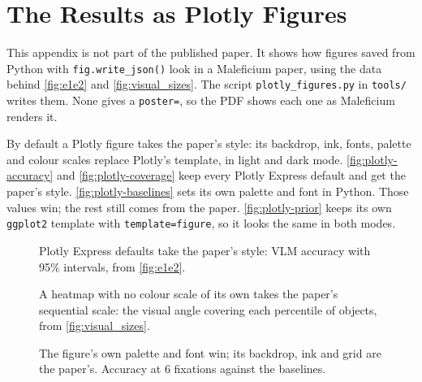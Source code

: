 \section{The Results as Plotly Figures}
\label{sec:plotly}

This appendix is not part of the published paper. It shows how figures saved from Python with \texttt{fig.write\_json()} look in a Maleficium paper, using the data behind \autoref{fig:e1e2} and \autoref{fig:visual_sizes}. The script \texttt{plotly\_figures.py} in \texttt{tools/} writes them. None gives a \texttt{poster=}, so the PDF shows each one as Maleficium renders it.

By default a Plotly figure takes the paper's style: its backdrop, ink, fonts, palette and colour scales replace Plotly's template, in light and dark mode. \autoref{fig:plotly-accuracy} and \autoref{fig:plotly-coverage} keep every Plotly Express default and get the paper's style. \autoref{fig:plotly-baselines} sets its own palette and font in Python. Those values win; the rest still comes from the paper. \autoref{fig:plotly-prior} keeps its own \texttt{ggplot2} template with \texttt{template=figure}, so it looks the same in both modes.

\begin{figure}[H]
  \centering
  \caption{Plotly Express defaults take the paper's style: VLM accuracy with 95\% intervals, from \autoref{fig:e1e2}.}
  \label{fig:plotly-accuracy}
\end{figure}

\begin{figure}[H]
  \centering
  \caption{A heatmap with no colour scale of its own takes the paper's sequential scale: the visual angle covering each percentile of objects, from \autoref{fig:visual_sizes}.}
  \label{fig:plotly-coverage}
\end{figure}

\begin{figure}[H]
  \centering
  \caption{The figure's own palette and font win; its backdrop, ink and grid are the paper's. Accuracy at 6 fixations against the baselines.}
  \label{fig:plotly-baselines}
\end{figure}

